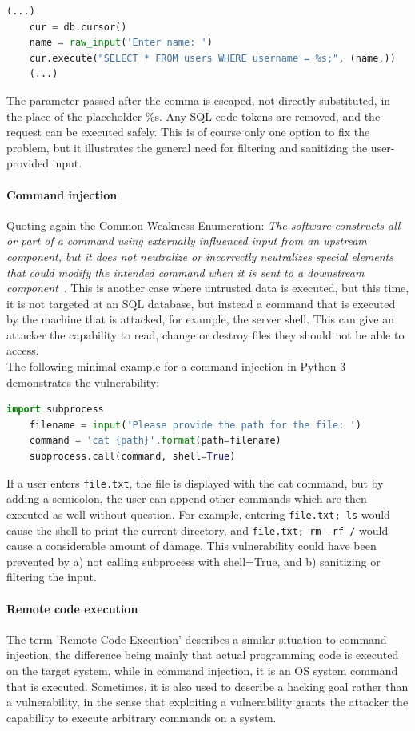 \documentclass[
a4paper,
pagesize,
pdftex,
12pt,
ngerman,
fleqn,
final,
]{scrartcl}
\begin{document}
	\begin{lstlisting}[language=Python,showstringspaces=false]
	(...)
	cur = db.cursor()
	name = raw_input('Enter name: ')
	cur.execute("SELECT * FROM users WHERE username = %s;", (name,))
	(...)
	\end{lstlisting}
	The parameter passed after the comma is escaped, not directly substituted, in the place of the placeholder \%s. Any SQL code tokens are removed, and the request can be executed safely. This is of course only one option to fix the problem, but it illustrates the general need for filtering and sanitizing the user-provided input. 
	
	\paragraph{Command injection}
	Quoting again the Common Weakness Enumeration: \textit{The software constructs all or part of a command using externally influenced input from an upstream component, but it does not neutralize or incorrectly neutralizes special elements that could modify the intended command when it is sent to a downstream component}~\cite{CommonWeaknessEnumeration.23.9.2019}. This is another case where untrusted data is executed, but this time, it is not targeted at an SQL database, but instead a command that is executed by the machine that is attacked, for example, the server shell. This can give an attacker the capability to read, change or destroy files they should not be able to access. \\
	The following minimal example for a command injection in Python 3 demonstrates the vulnerability:
	\begin{lstlisting}[language=Python,showstringspaces=false]
	import subprocess
	filename = input('Please provide the path for the file: ')
	command = 'cat {path}'.format(path=filename)
	subprocess.call(command, shell=True)
	\end{lstlisting}
	If a user enters \texttt{file.txt}, the file is displayed with the cat command, but by adding a semicolon, the user can append other commands which are then executed as well without question. For example, entering \texttt{file.txt; ls} would cause the shell to print the current directory, and \texttt{file.txt; rm -rf /} would cause a considerable amount of damage. This vulnerability could have been prevented by a) not calling subprocess with shell=True, and b) sanitizing or filtering the input. 
	
	\paragraph{Remote code execution}
	The term 'Remote Code Execution' describes a similar situation to command injection, the difference being mainly that actual programming code is executed on the target system, while in command injection, it is an OS system command that is executed. Sometimes, it is also used to describe a hacking goal rather than a vulnerability, in the sense that exploiting a vulnerability grants the attacker the capability to execute arbitrary commands on a system. 
	
\end{document}

